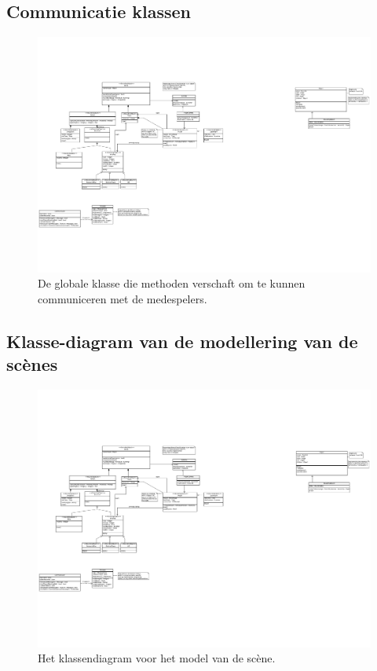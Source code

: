 \documentclass[a4paper,11pt]{article}
\begin{document}
    \subsection{Communicatie klassen}
    \begin{figure}[h]
        \centering
    	\includegraphics{../Class-diagram/NetCommunication.pdf}
	\caption{De globale klasse die methoden verschaft om te kunnen communiceren met de medespelers.}
    \end{figure}
    \label{app:Comm}
    \FloatBarrier
    \newpage
    \subsection{Klasse-diagram van de modellering van de sc\`enes}
    \begin{figure}[h]
        \centering
    	\includegraphics{../Class-diagram/SceneModel.pdf}
	\caption{Het klassendiagram voor het model van de sc\`ene.}
    \end{figure}
    \label{app:Scene}
    \FloatBarrier
    \newpage
\end{document}

